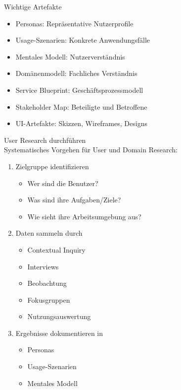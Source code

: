 \begin{theorem}{Wichtige Artefakte}
\begin{itemize}
    \item Personas: Repräsentative Nutzerprofile
    \item Usage-Szenarien: Konkrete Anwendungsfälle
    \item Mentales Modell: Nutzerverständnis
    \item Domänenmodell: Fachliches Verständnis
    \item Service Blueprint: Geschäftsprozessmodell
    \item Stakeholder Map: Beteiligte und Betroffene
    \item UI-Artefakte: Skizzen, Wireframes, Designs
\end{itemize}
\end{theorem}

\begin{KR}{User Research durchführen}\\
Systematisches Vorgehen für User und Domain Research:
\begin{enumerate}
    \item Zielgruppe identifizieren
    \begin{itemize}
        \item Wer sind die Benutzer?
        \item Was sind ihre Aufgaben/Ziele?
        \item Wie sieht ihre Arbeitsumgebung aus?
    \end{itemize}

    \item Daten sammeln durch
    \begin{itemize}
        \item Contextual Inquiry
        \item Interviews
        \item Beobachtung
        \item Fokusgruppen
        \item Nutzungsauswertung
    \end{itemize}
    \item Ergebnisse dokumentieren in
    \begin{itemize}
        \item Personas
        \item Usage-Szenarien
        \item Mentales Modell
    \end{itemize}
\end{enumerate}
\end{KR}

